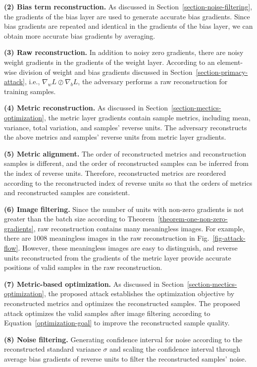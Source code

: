 \documentclass[lettersize,journal]{IEEEtran}
\begin{document}
\textbf{(2) Bias term reconstruction.} As discussed in Section~\ref{section-noise-filtering}, the gradients of the bias layer are used to generate accurate bias gradients. Since bias gradients are repeated and identical in the gradients of the bias layer, we can obtain more accurate bias gradients by averaging.

\textbf{(3) Raw reconstruction.} In addition to noisy zero gradients, there are noisy weight gradients in the gradients of the weight layer. According to an element-wise division of weight and bias gradients discussed in Section~\ref{section-primacy-attack}, i.e., $\nabla_w L \oslash \nabla_b L$, the adversary performs a raw reconstruction for training samples.

\textbf{(4) Metric reconstruction.} As discussed in Section~\ref{section-mectics-optimization}, the metric layer gradients contain sample metrics, including mean, variance, total variation, and samples' reverse units. The adversary reconstructs the above metrics and samples' reverse units from metric layer gradients.

\textbf{(5) Metric alignment.} The order of reconstructed metrics and reconstruction samples is different, and the order of reconstructed samples can be inferred from the index of reverse units. Therefore, reconstructed metrics are reordered according to the reconstructed index of reverse units so that the orders of metrics and reconstructed samples are consistent.

\textbf{(6) Image filtering.} Since the number of units with non-zero gradients is not greater than the batch size according to Theorem~\ref{theorem-one-non-zero-gradients}, raw reconstruction contains many meaningless images. For example, there are 1008 meaningless images in the raw reconstruction in Fig.~\ref{fig-attack-flow}. However, these meaningless images are easy to distinguish, and reverse units reconstructed from the gradients of the metric layer provide accurate positions of valid samples in the raw reconstruction.

\textbf{(7) Metric-based optimization.} As discussed in Section~\ref{section-mectics-optimization}, the proposed attack establishes the optimization objective by reconstructed metrics and optimizes the reconstructed samples. The proposed attack optimizes the valid samples after image filtering according to Equation~\eqref{optimization-goal} to improve the reconstructed sample quality.

\textbf{(8) Noise filtering.} Generating confidence interval for noise according to the reconstructed standard variance $\sigma$ and scaling the confidence interval through average bias gradients of reverse units to filter the reconstructed samples' noise.
\end{document}
